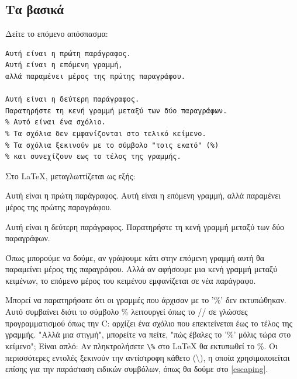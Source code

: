 \documentclass[inscr,ack,preface]{dimscthesis}
\begin{document}
\subsection{Τα βασικά} \label{basics}

Δείτε το επόμενο απόσπασμα:

\begin{verbatim}
Αυτή είναι η πρώτη παράγραφος.
Αυτή είναι η επόμενη γραμμή,
αλλά παραμένει μέρος της πρώτης παραγράφου.

Αυτή είναι η δεύτερη παράγραφος.
Παρατηρήστε τη κενή γραμμή μεταξύ των δύο παραγράφων.
% Αυτό είναι ένα σχόλιο.
% Τα σχόλια δεν εμφανίζονται στο τελικό κείμενο.
% Τα σχόλια ξεκινούν με το σύμβολο "τοις εκατό" (%)
% και συνεχίζουν εως το τέλος της γραμμής.
\end{verbatim}

Στο \LaTeX{}, μεταγλωττίζεται ως εξής:

Αυτή είναι η πρώτη παράγραφος.
Αυτή είναι η επόμενη γραμμή, αλλά παραμένει μέρος της πρώτης παραγράφου.

Αυτή είναι η δεύτερη παράγραφος.
Παρατηρήστε τη κενή γραμμή μεταξύ των δύο παραγράφων.

Όπως μπορούμε να δούμε, αν γράψουμε κάτι στην επόμενη γραμμή αυτή θα παραμείνει μέρος της παραγράφου.
Αλλά αν αφήσουμε μια κενή γραμμή μεταξύ κειμένων, το επόμενο μέρος του κειμένου εμφανίζεται σε νέα παράγραφο.

Μπορεί να παρατηρήσατε ότι οι γραμμές που άρχισαν με το '\%' δεν εκτυπώθηκαν.
Αυτό συμβαίνει διότι το σύμβολο \% λειτουργεί όπως το // σε γλώσσες προγραμματισμού όπως την C: αρχίζει ένα σχόλιο που επεκτείνεται έως το τέλος της γραμμής.
"Αλλά μια στιγμή", μπορείτε να πείτε, "πώς έβαλες το '\%' μόλις τώρα στο κείμενο";
Είναι απλό: Αν πληκτρολήσετε \verb|\%| στο \LaTeX{} θα εκτυπωθεί το \%.
Οι περισσότερες εντολές ξεκινούν την αντίστροφη κάθετο (\textbackslash), η οποία χρησιμοποιείται επίσης για την παράσταση ειδικών συμβόλων, όπως θα δούμε στο \ref{escaping}.
\end{document}
